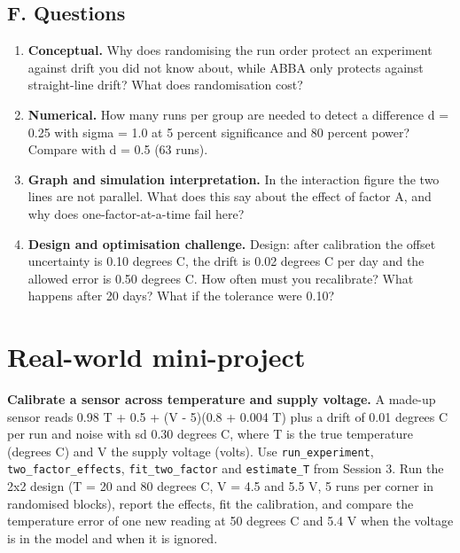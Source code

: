 \documentclass[11pt,a4paper]{article}
\begin{document}
\subsection*{F. Questions}
\begin{enumerate}[nosep]
\item \textbf{Conceptual.} Why does randomising the run order protect an experiment against drift you did not know about, while ABBA only protects against straight-line drift? What does randomisation cost?
\item \textbf{Numerical.} How many runs per group are needed to detect a difference d = 0.25 with sigma = 1.0 at 5 percent significance and 80 percent power? Compare with d = 0.5 (63 runs).
\item \textbf{Graph and simulation interpretation.} In the interaction figure the two lines are not parallel. What does this say about the effect of factor A, and why does one-factor-at-a-time fail here?
\item \textbf{Design and optimisation challenge.} Design: after calibration the offset uncertainty is 0.10 degrees C, the drift is 0.02 degrees C per day and the allowed error is 0.50 degrees C. How often must you recalibrate? What happens after 20 days? What if the tolerance were 0.10?
\end{enumerate}

\section{Real-world mini-project}
\textbf{Calibrate a sensor across temperature and supply voltage.} A made-up sensor reads 0.98 T + 0.5 + (V - 5)(0.8 + 0.004 T) plus a drift of 0.01 degrees C per run and noise with sd 0.30 degrees C, where T is the true temperature (degrees C) and V the supply voltage (volts). Use \texttt{run\_experiment}, \texttt{two\_factor\_effects}, \texttt{fit\_two\_factor} and \texttt{estimate\_T} from Session 3. Run the 2x2 design (T = 20 and 80 degrees C, V = 4.5 and 5.5 V, 5 runs per corner in randomised blocks), report the effects, fit the calibration, and compare the temperature error of one new reading at 50 degrees C and 5.4 V when the voltage is in the model and when it is ignored.
\end{document}
